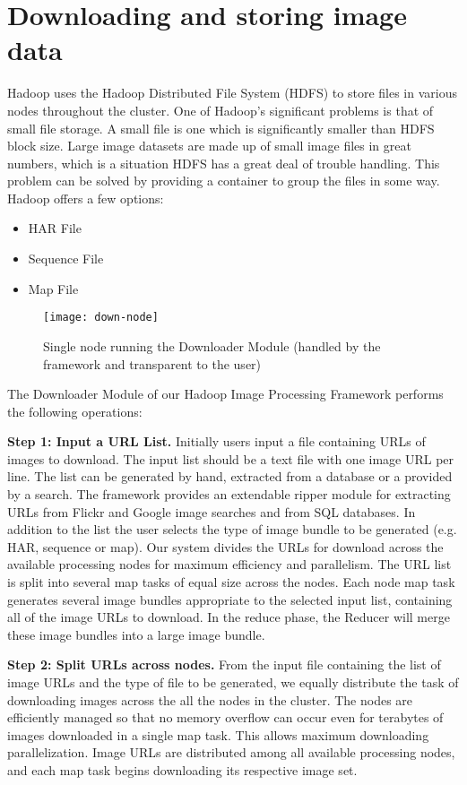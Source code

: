 \section{Downloading and storing image data}
Hadoop uses the Hadoop Distributed File System (HDFS)\cite{Shvachko2010} to store files
in various nodes throughout the cluster.  One of Hadoop's significant
problems is that of small file storage. \cite{White2009} A small file
is one which is significantly smaller than HDFS block size.  Large
image datasets are made up of small image files in great numbers,
which is a situation HDFS has a great deal of trouble
handling. This problem can be solved by providing a container to group
the files in some way. Hadoop offers a few options:
\begin{itemize}
	\item HAR File
	\item Sequence File
	\item Map File
\end{itemize}
\begin{figure}[h]
	\centering
	\texttt{[image: down-node]}
	\caption{Single node running the Downloader Module (handled by
		the framework and transparent to the user)}
	\label{fig:down-node}
\end{figure}
The Downloader Module of our Hadoop Image Processing Framework
performs the following operations:

\textbf{Step 1: Input a URL List.} Initially users input a file
containing URLs of images to download. The input list should be a text
file with one image URL per line. The list can be generated by hand,
extracted from a database or a provided by a search. The framework
provides an extendable ripper module for extracting URLs from Flickr
and Google image searches and from SQL databases. In addition to the
list the user selects the type of image bundle to be generated
(e.g. HAR, sequence or map).  Our system divides the URLs for download
across the available processing nodes for maximum efficiency and
parallelism. The URL list is split into several map tasks of equal size across the nodes. Each node map task generates several image bundles
appropriate to the selected input list, containing all of the image URLs
to download. In the reduce phase, the Reducer will merge these image
bundles into a large image bundle.


\textbf{Step 2: Split URLs across nodes.}  From the input file
containing the list of image URLs and the type of file to be
generated, we equally distribute the task of downloading images across
the all the nodes in the cluster. The nodes are efficiently managed so
that no memory overflow can occur even for terabytes of images
downloaded in a single map task. This allows maximum downloading
parallelization. Image URLs are distributed among all available
processing nodes, and each map task begins downloading its respective
image set.

